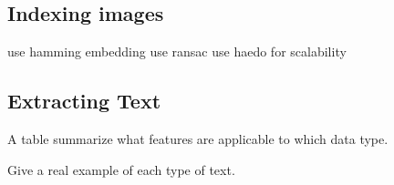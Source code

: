 \documentclass{www2010-submission}
\begin{document}
%




\subsection{Indexing images}
        use hamming embedding
        use ransac
        use haedo for scalability

\subsection{Extracting Text}

A table summarize what features are applicable to which data type.

Give a real example of each type of text.
\end{document}
